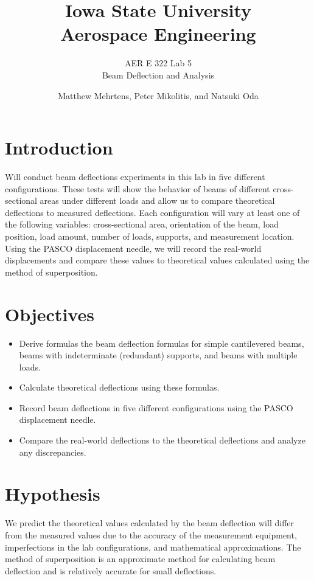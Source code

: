 \documentclass[12 pt]{article}
\title{\textbf{Iowa State University
\\{\Large Aerospace Engineering}}}
\subtitle{AER E 322 Lab 5\\
		  Beam Deflection and Analysis}
\author{Matthew Mehrtens, Peter Mikolitis, and Natsuki Oda}
\begin{document}
\maketitle
\tableofcontents
\section{Introduction} \label{introduction}
Will conduct beam deflections experiments in this lab in five different configurations. These tests will show the behavior of beams of different cross-sectional areas under different loads and allow us to compare theoretical deflections to measured deflections. Each configuration will vary at least one of the following variables: cross-sectional area, orientation of the beam, load position, load amount, number of loads, supports, and measurement location. Using the PASCO displacement needle, we will record the real-world displacements and compare these values to theoretical values calculated using the method of superposition.

\section{Objectives} \label{objectives}
\begin{itemize}
	\item Derive formulas the beam deflection formulas for simple cantilevered beams, beams with indeterminate (redundant) supports, and beams with multiple loads.
	\item Calculate theoretical deflections using these formulas.
	\item Record beam deflections in five different configurations using the PASCO displacement needle.
	\item Compare the real-world deflections to the theoretical deflections and analyze any discrepancies.
\end{itemize}

\section{Hypothesis} \label{hypothesis}
We predict the theoretical values calculated by the beam deflection will differ from the measured values due to the accuracy of the measurement equipment, imperfections in the lab configurations, and mathematical approximations. The method of superposition is an approximate method for calculating beam deflection and is relatively accurate for small deflections.
\end{document}
